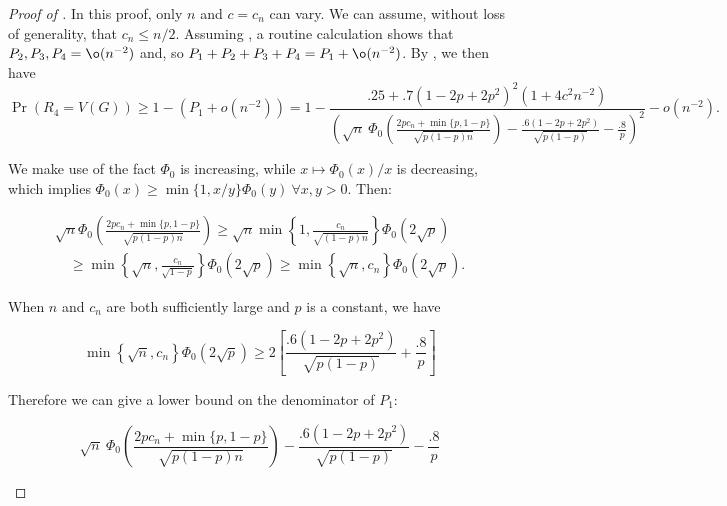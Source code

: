 \documentclass{toc}
\begin{document}
			\begin{proof}[Proof of ]
				In this proof, only $n$ and $c =c_n$ can vary. We can assume, without loss of generality, that $c_n \le n/2$.
				Assuming ,
				a routine calculation shows that $P_2, P_3, P_4 = \o(n^{-2})$ and, so $P_1 + P_2 + P_3 + P_4 = P_1 + \o(n^{-2})$.
				By , we then have
				\[
				\Pr(R_4 = V(G)) \ge 1 - (P_1 + o(n^{-2}))
				= 1 - \frac{.25 + .7(1 - 2p + 2p^2)^2 \left(1 + 4c^2n^{-2}\right)}{\left(\sqrt{n}\ \Phi_0 \left( \frac{2pc_n  %
						+ \min\{p, 1 - p\}  %
					}{\sqrt{p(1 - p)n}} \right) - \frac{.6(1 - 2p + 2p^2)}{\sqrt{p(1 - p)}}- \frac{.8}{p}\right)^2} - o(n^{-2}).
				\]
				
				We make use of the fact $\Phi_0$ is increasing, while $x\mapsto \Phi_0(x)/x$ is decreasing,
				which implies $\Phi_0(x) \ge \min\{1, x/y\}\Phi_0(y) \ \forall x, y > 0$.
				Then:
				\begin{linenomath}\begin{equation*}
						\begin{aligned}
							\sqrt{n}\Phi_0\left(\frac{2pc_n  %
								+ \min\{p, 1 - p\}  %
							}{\sqrt{p(1 - p)n}}\right)
							\ge \sqrt{n}\min\left\{1, \frac{c_n}{\sqrt{(1 - p)n}} \right\} \Phi_0\left(2\sqrt{p}\right) \\
							\quad \ge \min\left\{\sqrt{n}, \frac{c_n}{\sqrt{1 - p}} \right\} \Phi_0\left(2\sqrt{p}\right)
							\ge \min\left\{\sqrt{n}, c_n \right\} \Phi_0\left(2\sqrt{p}\right).
						\end{aligned}
				\end{equation*}\end{linenomath}
				When $n$ and $c_n$ are both sufficiently large and $p$ is a constant, we have
				\begin{linenomath}\begin{equation*}
						\min\left\{\sqrt{n}, c_n \right\} \Phi_0\left(2\sqrt{p}\right) \ge 2\left[\frac{.6(1 - 2p + 2p^2)}{\sqrt{p(1 - p)}} + \frac{.8}{p} \right]
				\end{equation*}\end{linenomath}
				Therefore we can %
				give a lower bound on %
				the denominator of $P_1$:
				\begin{linenomath}\begin{equation*}
						\sqrt{n}\ \Phi_0 \left( \frac{2pc_n  %
							+ \min\{p, 1 - p\}  %
						}{\sqrt{p(1 - p)n}} \right) - \frac{.6(1 - 2p + 2p^2)}{\sqrt{p(1 - p)}}- \frac{.8}{p}

\end{equation*}
\end{linenomath}
\end{proof}
\end{document}
